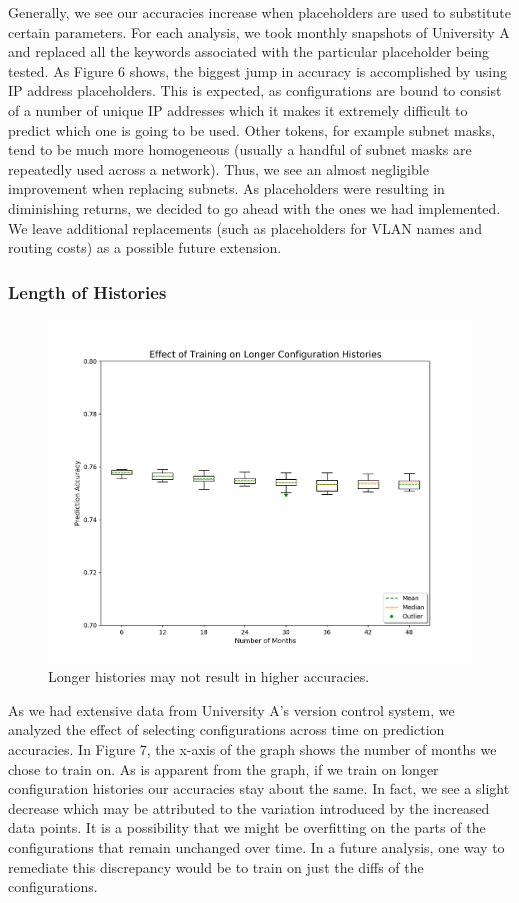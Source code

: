 Generally, we see our accuracies increase when placeholders are used to substitute certain parameters. For each analysis, we took monthly snapshots of University A and replaced all the keywords associated with the particular placeholder being tested. As Figure 6 shows, the biggest jump in accuracy is accomplished by using IP address placeholders. This is expected, as configurations are bound to consist of a number of unique IP addresses which it makes it extremely difficult to predict which one is going to be used. Other tokens, for example subnet masks, tend to be much more homogeneous (usually a handful of subnet masks are repeatedly used across a network). Thus, we see an almost negligible improvement when replacing subnets. As placeholders were resulting in diminishing returns, we decided to go ahead with the ones we had implemented. We leave additional replacements (such as placeholders for VLAN names and routing costs) as a possible future extension.

\subsubsection{Length of Histories}

\begin{figure}[H]
	\centering
	\includegraphics[width=\textwidth]{time.png}
	\caption{Longer histories may not result in higher accuracies.}
\end{figure}

As we had extensive data from University A's version control system, we analyzed the effect of selecting configurations across time on prediction accuracies. In Figure 7, the x-axis of the graph shows the number of months we chose to train on. As is apparent from the graph, if we train on longer configuration histories our accuracies stay about the same. In fact, we see a slight decrease which may be attributed to the variation introduced by the increased data points. It is a possibility that we might be overfitting on the parts of the configurations that remain unchanged over time. In a future analysis, one way to remediate this discrepancy would be to train on just the diffs of the configurations.\\

